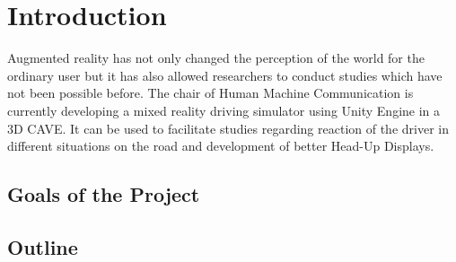 \chapter{Introduction}
\label{ch:introduction}
Augmented reality has not only changed the perception of the world for the ordinary user but it has also allowed researchers to conduct studies which have not been possible before. The chair of Human Machine Communication is currently developing a mixed reality driving simulator using Unity Engine in a 3D CAVE. It can be used to facilitate studies regarding reaction of the driver in different situations on the road and development of better Head-Up Displays. 
 
\section{Goals of the Project}
\label{sec:goals}


\section{Outline}
\label{sec:outline}


